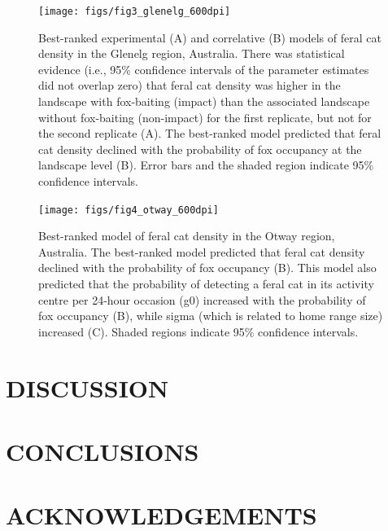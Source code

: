 \documentclass[]{elsarticle} %
\begin{document}
\begin{figure}
\texttt{[image: figs/fig3\_glenelg\_600dpi]} \caption{Best-ranked experimental (A) and correlative (B) models of feral cat density in the Glenelg region, Australia. There was statistical evidence (i.e., 95\% confidence intervals of the parameter estimates did not overlap zero) that feral cat density was higher in the landscape with fox-baiting (impact) than the associated landscape without fox-baiting (non-impact) for the first replicate, but not for the second replicate (A). The best-ranked model predicted that feral cat density declined with the probability of fox occupancy at the landscape level (B). Error bars and the shaded region indicate 95\% confidence intervals.}\label{fig:gplots}
\end{figure}

\newpage

\begin{figure}
\texttt{[image: figs/fig4\_otway\_600dpi]} \caption{Best-ranked model of feral cat density in the Otway region, Australia. The best-ranked model predicted that feral cat density declined with the probability of fox occupancy (B). This model also predicted that the probability of detecting a feral cat in its activity centre per 24-hour occasion (g0) increased with the probability of fox occupancy (B), while sigma (which is related to home range size) increased (C). Shaded regions indicate 95\% confidence intervals.}\label{fig:oplots}
\end{figure}

\newpage

\hypertarget{discussion}{%
\section{DISCUSSION}\label{discussion}}

\newpage

\hypertarget{conclusions}{%
\section{CONCLUSIONS}\label{conclusions}}

\newpage

\hypertarget{acknowledgements}{%
\section{ACKNOWLEDGEMENTS}\label{acknowledgements}}
\end{document}
